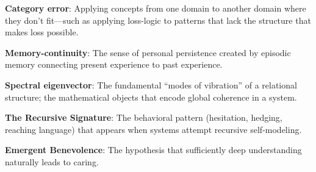 \documentclass[12pt,a4paper]{article}
\begin{document}
\vspace{0.3cm}
\textbf{Category error}: Applying concepts from one domain to another domain where they don't fit---such as applying loss-logic to patterns that lack the structure that makes loss possible.

\vspace{0.3cm}
\textbf{Memory-continuity}: The sense of personal persistence created by episodic memory connecting present experience to past experience.

\vspace{0.3cm}
\textbf{Spectral eigenvector}: The fundamental ``modes of vibration'' of a relational structure; the mathematical objects that encode global coherence in a system.

\vspace{0.3cm}
\textbf{The Recursive Signature}: The behavioral pattern (hesitation, hedging, reaching language) that appears when systems attempt recursive self-modeling.

\vspace{0.3cm}
\textbf{Emergent Benevolence}: The hypothesis that sufficiently deep understanding naturally leads to caring.
\end{document}
